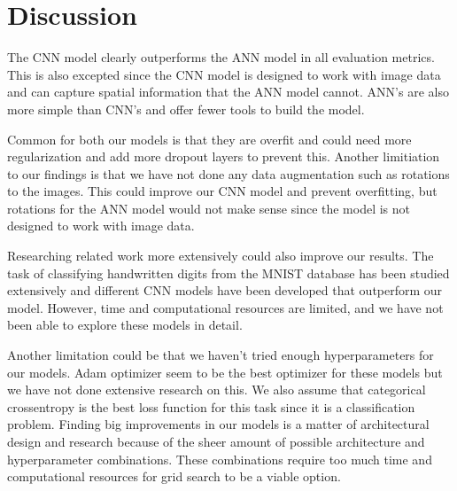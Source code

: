\section{Discussion}

The CNN model clearly outperforms the ANN model in all evaluation metrics. This is also excepted since the CNN model is designed to work with image data and can capture spatial information that the ANN model cannot. ANN's are also more simple than CNN's and offer fewer tools to build the model.
\par
Common for both our models is that they are overfit and could need more regularization and add more dropout layers to prevent this. Another limitiation to our findings is that we have not done any data augmentation such as rotations to the images. This could improve our CNN model and prevent overfitting, but rotations for the ANN model would not make sense since the model is not designed to work with image data.
\par
Researching related work more extensively could also improve our results. The task of classifying handwritten digits from the MNIST database has been studied extensively and different CNN models have been developed that outperform our model. However, time and computational resources are limited, and we have not been able to explore these models in detail.
\par
Another limitation could be that we haven't tried enough hyperparameters for our models. Adam optimizer seem to be the best optimizer for these models but we have not done extensive research on this. We also assume that categorical crossentropy is the best loss function for this task since it is a classification problem. Finding big improvements in our models is a matter of architectural design and research because of the sheer amount of possible architecture and hyperparameter combinations. These combinations require too much time and computational resources for grid search to be a viable option.